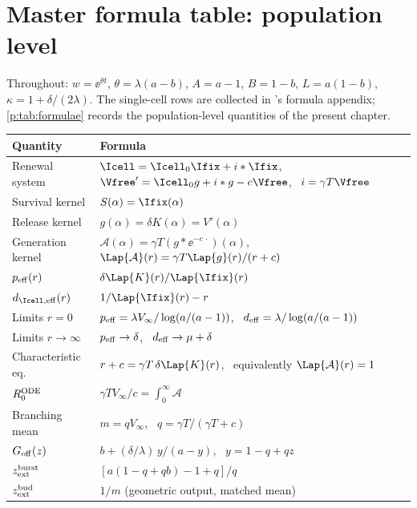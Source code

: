 
\section{Master formula table: population level}
\label{p:app:formulae}

Throughout: $w=\ee^{\theta t}$, $\theta=\lambda(a-b)$, $A=a-1$, $B=1-b$,
$L=a(1-b)$, $\kappa=1+\delta/(2\lambda)$. The single-cell rows are collected
in \ChDist{}'s formula appendix; \cref{p:tab:formulae} records the
population-level quantities of the present chapter.

\begin{table}[htbp]
\centering
\renewcommand{\arraystretch}{1.1}
\small
\begin{tabular}{@{}p{}p{}@{}}
\toprule
Quantity & Formula \\
\midrule
Renewal system & $\Icell=\Icell_0\Ifix+i*\Ifix$, \ $\Vfree'=\Icell_0 g+i*g-c\Vfree$, \ $i=\gamma T\Vfree$ \\
Survival kernel & $S(\alpha)=\Ifix(\alpha)$ \\
Release kernel & $g(\alpha)=\delta K(\alpha)=V'(\alpha)$ \\
Generation kernel & $\mathcal A(\alpha)=\gamma T(g*\ee^{-c\,\cdot})(\alpha)$, \ $\Lap{\mathcal A}(r)=\gamma T\Lap{g}(r)/(r+c)$ \\
$p_{\rm eff}(r)$ & $\delta\Lap{K}(r)/\Lap{\Ifix}(r)$ \\
$d_{\Icell,{\rm eff}}(r)$ & $1/\Lap{\Ifix}(r)-r$ \\
Limits $r=0$ & $p_{\rm eff}=\lambda V_\infty/\log(a/(a-1))$, \ $d_{\rm eff}=\lambda/\log(a/(a-1))$ \\
Limits $r\to\infty$ & $p_{\rm eff}\to\delta$, \ $d_{\rm eff}\to\mu+\delta$ \\
Characteristic eq. & $r+c=\gamma T\,\delta\Lap{K}(r)$, \ equivalently $\Lap{\mathcal A}(r)=1$ \\
$R_0^{\rm ODE}$ & $\gamma T V_\infty/c=\int_0^\infty\mathcal A$ \\
Branching mean & $m=qV_\infty$, \ $q=\gamma T/(\gamma T+c)$ \\
$G_{\rm off}(z)$ & $b+(\delta/\lambda)\,y/(a-y)$, \ $y=1-q+qz$ \\
$z_{\rm ext}^{\rm burst}$ & $[a(1-q+qb)-1+q]/q$ \\
$z_{\rm ext}^{\rm bud}$ & $1/m$ (geometric output, matched mean) \\

\end{tabular}
\end{table}
